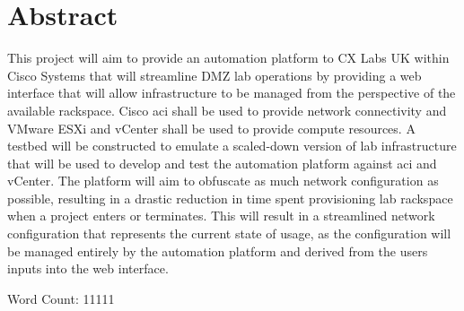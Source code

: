 \section*{Abstract}
This project will aim to provide an automation platform to CX Labs UK within Cisco Systems that will streamline DMZ lab operations by providing a web interface that will allow infrastructure to be managed from the perspective of the available rackspace. Cisco \gls{aci} shall be used to provide network connectivity and VMware ESXi and vCenter shall be used to provide compute resources. A testbed will be constructed to emulate a scaled-down version of lab infrastructure that will be used to develop and test the automation platform against \gls{aci} and vCenter. The platform will aim to obfuscate as much network configuration as possible, resulting in a drastic reduction in time spent provisioning lab rackspace when a project enters or terminates. This will result in a streamlined network configuration that represents the current state of usage, as the configuration will be managed entirely by the automation platform and derived from the users inputs into the web interface.



Word Count: 11111
